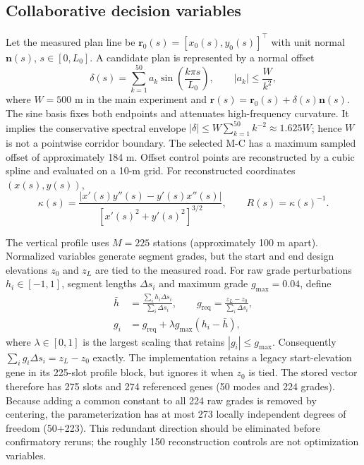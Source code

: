\documentclass[preprint,12pt]{elsarticle}
\begin{document}
\subsection{Collaborative decision variables}

Let the measured plan line be $\bm r_0(s)=[x_0(s),y_0(s)]^\top$ with unit normal $\bm n(s)$, $s\in[0,L_0]$. A candidate plan is represented by a normal offset
\begin{equation}
\delta(s)=\sum_{k=1}^{50}a_k\sin\left(\frac{k\pi s}{L_0}\right), \qquad
|a_k|\leq \frac{W}{k^2},
\label{eq:sine}
\end{equation}
where $W=500$ m in the main experiment and $\bm r(s)=\bm r_0(s)+\delta(s)\bm n(s)$. The sine basis fixes both endpoints and attenuates high-frequency curvature. It implies the conservative spectral envelope $|\delta|\leq W\sum_{k=1}^{50}k^{-2}\approx1.625W$; hence $W$ is not a pointwise corridor boundary. The selected M-C has a maximum sampled offset of approximately 184 m. Offset control points are reconstructed by a cubic spline and evaluated on a 10-m grid. For reconstructed coordinates $(x(s),y(s))$,
\begin{equation}
\kappa(s)=\frac{|x'(s)y''(s)-y'(s)x''(s)|}
{[x'(s)^2+y'(s)^2]^{3/2}},\qquad R(s)=\kappa(s)^{-1}.
\label{eq:curvature}
\end{equation}

The vertical profile uses $M=225$ stations (approximately 100 m apart). Normalized variables generate segment grades, but the start and end design elevations $z_0$ and $z_L$ are tied to the measured road. For raw grade perturbations $h_i\in[-1,1]$, segment lengths $\Delta s_i$ and maximum grade $g_{\max}=0.04$, define
\begin{align}
\bar h&=\frac{\sum_i h_i\Delta s_i}{\sum_i\Delta s_i},\qquad
g_{\mathrm{req}}=\frac{z_L-z_0}{\sum_i\Delta s_i},\\
g_i&=g_{\mathrm{req}}+\lambda g_{\max}(h_i-\bar h),
\label{eq:grades}
\end{align}
where $\lambda\in[0,1]$ is the largest scaling that retains $|g_i|\leq g_{\max}$. Consequently $\sum_i g_i\Delta s_i=z_L-z_0$ exactly. The implementation retains a legacy start-elevation gene in its 225-slot profile block, but ignores it when $z_0$ is tied. The stored vector therefore has 275 slots and 274 referenced genes (50 modes and 224 grades). Because adding a common constant to all 224 raw grades is removed by centering, the parameterization has at most 273 locally independent degrees of freedom (50+223). This redundant direction should be eliminated before confirmatory reruns; the roughly 150 reconstruction controls are not optimization variables.
\end{document}
